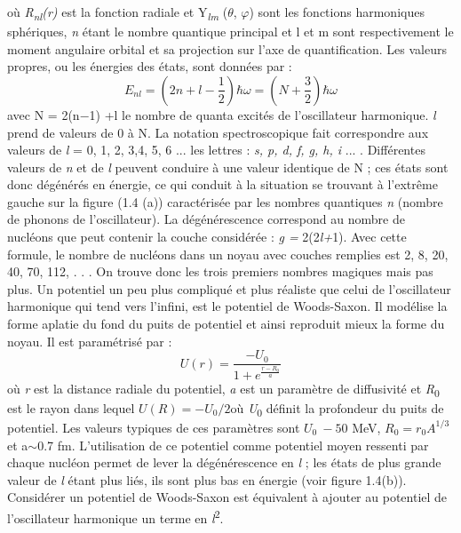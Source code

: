 où \textit{R}\textit{\textsubscript{nl}}\textit{(r)} est la fonction radiale et Y\textit{\textsubscript{lm }}($\theta $, $\varphi $) sont les fonctions harmoniques sphériques, \textit{n} étant le nombre quantique principal et l et m sont
respectivement le moment angulaire orbital et sa projection sur l'axe de quantification. Les valeurs propres, ou les
énergies des états, sont données par :
 \begin{equation}
E_{\mathit{nl}}=(2n+l-\frac 1 2 )\hbar \omega =(N+\frac 3 2) \hbar \omega
\end{equation}
avec N = 2(n$-$1) +l le nombre de quanta excités de l'oscillateur harmonique. \textit{l} prend de valeurs de 0 à N. La
notation spectroscopique fait correspondre aux valeurs de \textit{l} = 0, 1, 2, 3,4, 5, 6 ... les lettres : \textit{s,
p, d, f, g, h, i} ... . Différentes valeurs de \textit{n} et de \textit{l} peuvent conduire à une valeur identique de N
; ces états sont donc dégénérés en énergie, ce qui conduit à la situation se trouvant à l'extrême gauche sur la figure
(1.4 (a)) caractérisée par les nombres quantiques \textit{n} (nombre de phonons de l'oscillateur). La dégénérescence
correspond au nombre de nucléons que peut contenir la couche considérée : \textit{g = }2(2\textit{l+}1). Avec cette
formule, le nombre de nucléons dans un noyau avec couches remplies est 2, 8, 20, 40, 70, 112, . . . On trouve donc les
trois premiers nombres magiques mais pas plus. Un potentiel un peu plus compliqué et plus réaliste que celui de
l'oscillateur harmonique qui tend vers l'infini, est le potentiel de Woods-Saxon. Il modélise la forme aplatie du fond
du puits de potentiel et ainsi reproduit mieux la forme du noyau. Il est paramétrisé par :
\begin{equation} U\left(r\right)=\frac{-U_0}{1+e^{\frac{r-R_0}
a}}\end{equation}
où \textit{r} est la distance radiale du potentiel, \textit{a} est un paramètre de diffusivité et
\textit{R}\textsubscript{0} est le rayon dans lequel $U\left(R\right)=-U_0/2$où \textit{U}\textsubscript{0} définit
la profondeur du puits de potentiel. Les valeurs typiques de ces paramètres sont $U_0\ -50$ MeV, $R_0=r_0A^{1/3}$ et
a${\sim}$0.7 fm.
L'utilisation de ce potentiel comme potentiel moyen ressenti par chaque nucléon permet de lever la dégénérescence en
\textit{l} ; les états de plus grande valeur de \textit{l} étant plus liés, ils sont plus bas en énergie (voir figure
1.4(b)). Considérer un potentiel de Woods-Saxon est équivalent à ajouter au potentiel de l'oscillateur harmonique un
terme en \textit{l}\textsuperscript{2}.
